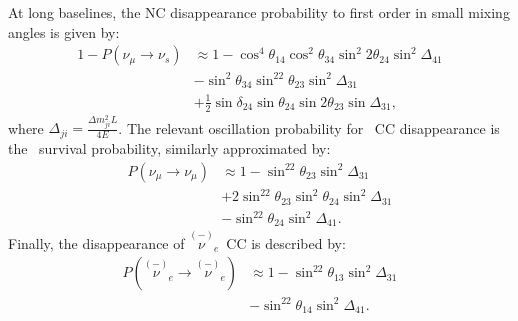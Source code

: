 At long baselines, the NC disappearance probability to first order in small mixing angles is given by:
\begin{equation}
\begin{aligned}
1 - P(\nu_{\mu} \rightarrow \nu_s) & \approx 1 - \cos^4\theta_{14}\cos^2\theta_{34}\sin^{2}2\theta_{24}\sin^2\Delta_{41} \\
& - \sin^2\theta_{34}\sin^22\theta_{23}\sin^2\Delta_{31} \\
& + \frac{1}{2}\sin\delta_{24}\sin\theta_{24}\sin2\theta_{23}\sin\Delta_{31},
\end{aligned}
\end{equation}
where $\Delta_{ji} = \frac{\Delta m^2_{ji}L}{4E}$.
The relevant oscillation probability for \numu~CC disappearance is the \numu~survival probability, similarly approximated by:
\begin{equation}
\begin{aligned}
P(\nu_{\mu} \rightarrow \nu_{\mu}) &\approx 1 - \sin^22\theta_{23}\sin^2\Delta_{31} \\
& + 2\sin^22\theta_{23}\sin^2\theta_{24}\sin^2\Delta_{31} \\ 
& - \sin^22\theta_{24}\sin^2\Delta_{41}.
\label{eq:NuMuDisFull}
\end{aligned}
\end{equation}
Finally, the disappearance of $\overset{(-)}\nu\!\!_e$~CC is described by:
\begin{equation}
\begin{aligned}
P(\overset{(-)}\nu\!\!_e \rightarrow \overset{(-)}\nu\!\!_e) &\approx 1 - \sin^22\theta_{13}\sin^2\Delta_{31} \\
& - \sin^22\theta_{14}\sin^2\Delta_{41}.
\label{eq:NueDisFull}
\end{aligned}
\end{equation}

